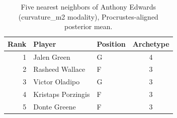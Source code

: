 \begin{table}[htbp]
  \centering\small
  \begin{tabular}{rllc}
    \toprule
    Rank & Player & Position & Archetype \\
    \midrule
    1 & Jalen Green & G & 4 \\
    2 & Rasheed Wallace & F & 3 \\
    3 & Victor Oladipo & G & 3 \\
    4 & Kristaps Porzingis & F & 3 \\
    5 & Donte Greene & F & 3 \\
    \bottomrule
  \end{tabular}
  \caption{Five nearest neighbors of Anthony Edwards (curvature_m2 modality), Procrustes-aligned posterior mean.}
  \label{tab:Anthony_Edwards_neighbors_curvature_m2}
\end{table}

